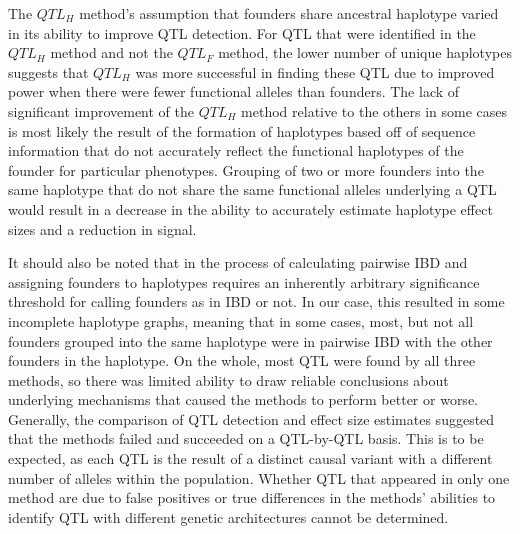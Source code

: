 \documentclass[article,9pt,twocolumn,twoside]{rilabRxiv}
\begin{document}
The $QTL_H$ method's assumption that founders share ancestral haplotype varied in its ability to improve QTL detection.
For QTL that were identified in the $QTL_H$ method and not the $QTL_F$ method, the lower number of unique haplotypes suggests that $QTL_H$ was more successful in finding these QTL due to improved power when there were fewer functional alleles than founders.
The lack of significant improvement of the $QTL_H$ method relative to the others in some cases is most likely the result of the formation of haplotypes based off of sequence information that do not accurately reflect the functional haplotypes of the founder for particular phenotypes.
Grouping of two or more founders into the same haplotype that do not share the same functional alleles underlying a QTL would result in a decrease in the ability to accurately estimate haplotype effect sizes and a reduction in signal.

It should also be noted that in the process of calculating pairwise IBD and assigning founders to haplotypes requires an inherently arbitrary significance threshold for calling founders as in IBD or not.
In our case, this resulted in some incomplete haplotype graphs, meaning that in some cases, most, but not all founders grouped into the same haplotype were in pairwise IBD with the other founders in the haplotype.
On the whole, most QTL were found by all three methods, so there was limited ability to draw reliable conclusions about underlying mechanisms that caused the methods to perform better or worse.
Generally, the comparison of QTL detection and effect size estimates suggested that the methods failed and succeeded on a QTL-by-QTL basis.
This is to be expected, as each QTL is the result of a distinct causal variant with a different number of alleles within the population.
Whether QTL that appeared in only one method are due to false positives or true differences in the methods' abilities to identify QTL with different genetic architectures cannot be determined.
\end{document}
